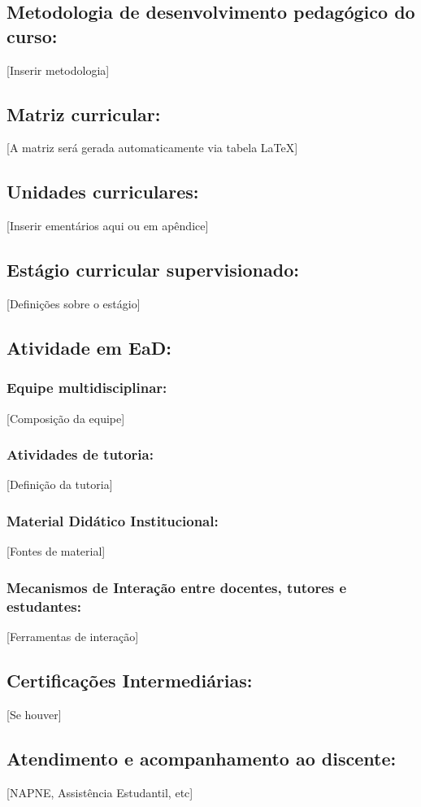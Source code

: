 \documentclass{../../modelos/latex-shared/ifsc-ppc}
\begin{document}
\subsection{Metodologia de desenvolvimento pedagógico do curso:}
[Inserir metodologia]

\subsection{Matriz curricular:}
[A matriz será gerada automaticamente via tabela LaTeX]

\subsection{Unidades curriculares:}
[Inserir ementários aqui ou em apêndice]

\subsection{Estágio curricular supervisionado:}
[Definições sobre o estágio]

\subsection{Atividade em EaD:}
\subsubsection{Equipe multidisciplinar:}
[Composição da equipe]
\subsubsection{Atividades de tutoria:}
[Definição da tutoria]
\subsubsection{Material Didático Institucional:}
[Fontes de material]
\subsubsection{Mecanismos de Interação entre docentes, tutores e estudantes:}
[Ferramentas de interação]

\subsection{Certificações Intermediárias:}
[Se houver]

\subsection{Atendimento e acompanhamento ao discente:}
[NAPNE, Assistência Estudantil, etc]
\end{document}
